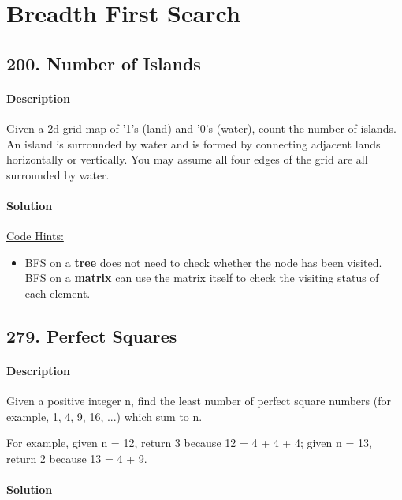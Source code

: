 \section{Breadth First Search}

\subsection{200. Number of Islands}

\paragraph{\color{white} \colorbox{Mahogany}{Description}}
Given a 2d grid map of '1's (land) and '0's (water), count the number of islands. An island is surrounded by water and is formed by connecting adjacent lands horizontally or vertically. You may assume all four edges of the grid are all surrounded by water.

\paragraph{\color{white} \colorbox{OliveGreen}{Solution}}
\underline{Code Hints:}
\begin{itemize}
    \item BFS on a \textbf{tree} does not need to check whether the node has been visited. BFS on a \textbf{matrix} can use the matrix itself to check the visiting status of each element.
\end{itemize}

\subsection{279. Perfect Squares}

\paragraph{\color{white} \colorbox{Mahogany}{Description}}
Given a positive integer n, find the least number of perfect square numbers (for example, 1, 4, 9, 16, ...) which sum to n.

For example, given n = 12, return 3 because 12 = 4 + 4 + 4; given n = 13, return 2 because 13 = 4 + 9.

\paragraph{\color{white} \colorbox{OliveGreen}{Solution}}

